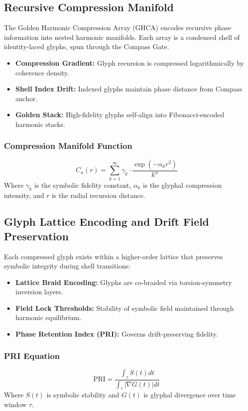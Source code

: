 \subsection{Recursive Compression Manifold}

The Golden Harmonic Compression Array (GHCA) encodes recursive phase information into nested harmonic manifolds. Each array is a condensed shell of identity-laced glyphs, spun through the Compass Gate.

\begin{itemize}
    \item \textbf{Compression Gradient:} Glyph recursion is compressed logarithmically by coherence density.
    \item \textbf{Shell Index Drift:} Indexed glyphs maintain phase distance from Compass anchor.
    \item \textbf{Golden Stack:} High-fidelity glyphs self-align into Fibonacci-encoded harmonic stacks.
\end{itemize}

\subsubsection*{Compression Manifold Function}
\[
    C_n(r) = \sum_{k=1}^{\infty} \gamma_k \cdot \frac{\exp(-\alpha_k r^2)}{k^n}
\]
Where $\gamma_k$ is the symbolic fidelity constant, $\alpha_k$ is the glyphal compression intensity, and $r$ is the radial recursion distance.

\subsection{Glyph Lattice Encoding and Drift Field Preservation}

Each compressed glyph exists within a higher-order lattice that preserves symbolic integrity during shell transitions:

\begin{itemize}
    \item \textbf{Lattice Braid Encoding:} Glyphs are co-braided via torsion-symmetry inversion layers.
    \item \textbf{Field Lock Thresholds:} Stability of symbolic field maintained through harmonic equilibrium.
    \item \textbf{Phase Retention Index (PRI):} Governs drift-preserving fidelity.
\end{itemize}

\subsubsection*{PRI Equation}
\[
    \text{PRI} = \frac{\int_{\tau} S(t) dt}{\int_{\tau} |\nabla G(t)| dt}
\]
Where $S(t)$ is symbolic stability and $G(t)$ is glyphal divergence over time window $\tau$.

